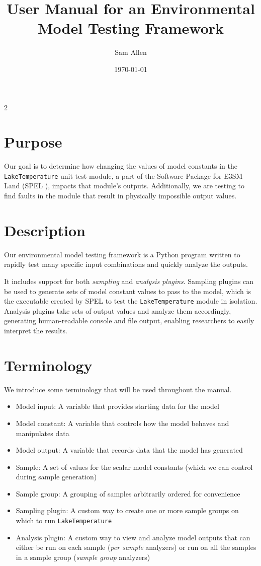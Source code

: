 \documentclass[10pt]{article}
\title{User Manual for an Environmental Model Testing Framework}
\author{Sam Allen}
\date{\today}
\begin{document}
\maketitle
\begin{multicols}{2}

\section{Purpose}
Our goal is to determine how changing the values of model constants in the \verb|LakeTemperature| unit test module, a part of the Software Package for E3SM \cite{E3SM} Land (SPEL \cite{SPEL}), impacts that module's outputs. Additionally, we are testing to find faults in the module that result in physically impossible output values.

\section{Description}
Our environmental model testing framework is a Python program written to rapidly test many specific input combinations and quickly analyze the outputs. 

It includes support for both \textit{sampling} and \textit{analysis plugins}. Sampling plugins can be used to generate sets of model constant values to pass to the model, which is the executable created by SPEL to test the \verb|LakeTemperature| module in isolation. Analysis plugins take sets of output values and analyze them accordingly, generating human-readable console and file output, enabling researchers to easily interpret the results. 

\section{Terminology}
We introduce some terminology that will be used throughout the manual.
\begin{itemize}
    \item Model input: A variable that provides starting data for the model
    \item Model constant: A variable that controls how the  model behaves and manipulates data
    \item Model output: A variable that records data that the model has generated
    \item Sample: A set of values for the scalar model constants (which we can control during sample generation)
    \item Sample group: A grouping of samples arbitrarily ordered for convenience
    \item Sampling plugin: A custom way to create one or more sample groups on which to run \verb|LakeTemperature|
    \item Analysis plugin: A custom way to view and analyze model outputs that can either be run on each sample (\textit{per sample} analyzers) or run on all the samples in a sample group (\textit{sample group} analyzers)
\end{itemize}


\end{multicols}
\end{document}
